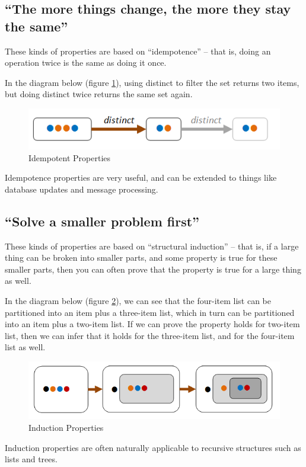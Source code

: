 \subsection{``The more things change, the more they stay the same''}
\label{sec:the_more_things_change}

These kinds of properties are based on ``idempotence'' -- that is, doing an operation twice is the same as doing it once.

In the diagram below (figure \ref{fig:choosing_properties_4}), using distinct to filter the set returns two items, but doing distinct twice returns the same set again.
\begin{figure}[htbp]
 \centering
 \includegraphics[width=.95\linewidth]{./pics/choosing_properties_4.png}
 \caption{Idempotent Properties}
 \label{fig:choosing_properties_4}
\end{figure}
Idempotence properties are very useful, and can be extended to things like database updates and message processing.



\subsection{``Solve a smaller problem first''}
\label{sec:solve_a_smaller_problem_first}

These kinds of properties are based on ``structural induction'' -- that is, if a large thing can be broken into smaller parts, and some property is true for these smaller parts, then you can often prove that the property is true for a large thing as well.

In the diagram below (figure \ref{fig:choosing_properties_5}), we can see that the four-item list can be partitioned into an item plus a three-item list, which in turn can be partitioned into an item plus a two-item list. If we can prove the property holds for two-item list, then we can infer that it holds for the three-item list, and for the four-item list as well.
\begin{figure}[htbp]
 \centering
 \includegraphics[width=.95\linewidth]{./pics/choosing_properties_5.png}
 \caption{Induction Properties}
 \label{fig:choosing_properties_5}
\end{figure}
Induction properties are often naturally applicable to recursive structures such as lists and trees.



